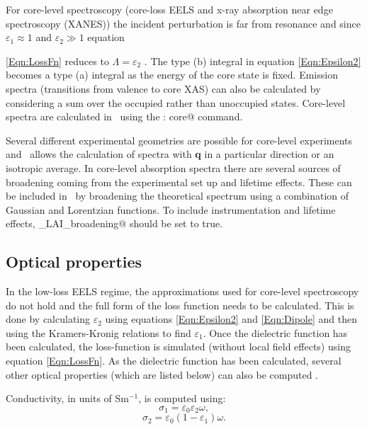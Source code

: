 \documentclass[a4paper,11pt,twoside]{book}
\begin{document}
For core-level spectroscopy (core-loss EELS and x-ray absorption near edge spectroscopy (XANES)) the incident perturbation is far from resonance and since $\varepsilon_1\approx1$ and $\varepsilon_2\gg1$ equation\,{\ref{Eqn:LossFn} reduces to  $\Lambda = \varepsilon_2$ \cite{egerton}.  
The type (b) integral in equation \ref{Eqn:Epsilon2} becomes a type (a) integral as the energy of the core state is fixed.  Emission spectra (transitions from valence to core XAS) can also be calculated by considering a sum over the occupied rather than unoccupied states.  Core-level spectra are calculated in \optados\ using the \verb@task : core@ command.

Several different experimental geometries are possible for core-level experiments and \optados\ allows the calculation of spectra with {\bf q} in a particular direction or an isotropic average.  
In core-level absorption spectra there are several sources of broadening coming from the experimental set up and lifetime effects.  These can be included in \optados\ by broadening the theoretical spectrum using a combination of Gaussian and Lorentzian functions.  To include instrumentation and lifetime effects, \verb@core_LAI_broadening@ should be set to true.  

\subsection{Optical properties}

In the low-loss EELS regime, the approximations used for core-level spectroscopy do not hold and the full form of the loss function needs to be calculated.  This is done by calculating $\varepsilon_2$ using equations \ref{Eqn:Epsilon2} and \ref{Eqn:Dipole} and then using the Kramers-Kronig relations to find $\varepsilon_1$.  Once the dielectric function has been calculated, the loss-function is simulated (without local field effects) using equation \ref{Eqn:LossFn}. As the dielectric function has been calculated, several other optical properties (which are listed below) can also be computed \cite{dressel}. 

Conductivity, in units of Sm$^{-1}$, is computed using:
\begin{equation}
\sigma_1 = \varepsilon_0 \varepsilon_2 \omega, 
\end{equation}
\begin{equation}
\sigma_2 = \varepsilon_0 \left ( 1 - \varepsilon_1 \right ) \omega.
\end{equation}

}
\end{document}
